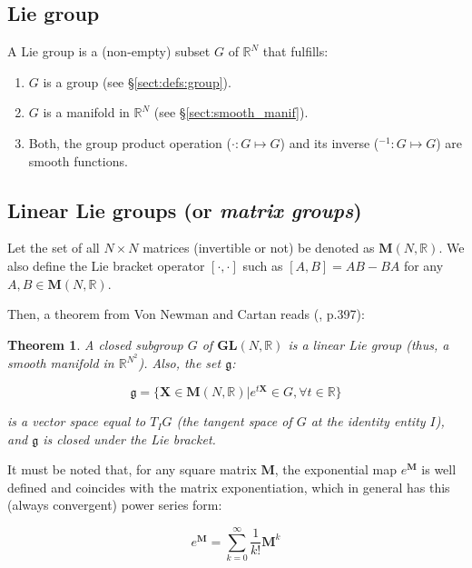 \documentclass[a4paper,11pt]{report}
\newtheorem{mytheorem}{Theorem}
\begin{document}
\subsection{Lie group}
\label{sect:lie_group_def}

A Lie group is a (non-empty) subset $G$ of $\mathbb{R}^N$ that fulfills:
\begin{enumerate}
 \item $G$ is a group (see \S\ref{sect:defs:group}).
 \item $G$ is a manifold in $\mathbb{R}^N$ (see \S\ref{sect:smooth_manif}).
 \item Both, the group product operation ($\cdot: G \mapsto G$) 
and its inverse (${}^{-1}: G \mapsto G$) are smooth functions.
\end{enumerate}


\subsection{Linear Lie groups (or \emph{matrix groups})}
\label{sect:lie:linear}

Let the set of all $N \times N$ matrices (invertible or not)
be denoted as $\mathbf{M}(N,\mathbb{R})$. 
We also define the Lie bracket operator $[\cdot,\cdot]$ such as 
$[A,B]=AB-BA$ for any $A,B \in \mathbf{M}(N,\mathbb{R})$.

Then, a theorem from Von Newman and Cartan reads (\cite{gallier2001geometric}, p.397):

\begin{mytheorem}
A closed subgroup $G$ of $\mathbf{GL}(N,\mathbb{R})$
is a linear Lie group (thus, a smooth manifold in $\mathbb{R}^{N^2}$).
Also, the set $\mathfrak{g}$:

\begin{equation}
  \mathfrak{g} = \{ \mathbf{X} \in \mathbf{M}(N,\mathbb{R}) | e^{t\mathbf{X}} \in G,  \forall t \in \mathbb{R}  \}
\end{equation}

\noindent is a vector space equal to $T_I G$ (the tangent space of $G$ 
at the identity entity $I$), and $\mathfrak{g}$ is closed under the Lie bracket.
\end{mytheorem}

It must be noted that, for any square matrix $\mathbf{M}$, 
the exponential map $e^{\mathbf{M}}$ is well defined and coincides with the matrix 
exponentiation, which in general has this (always convergent) power series form:

\begin{equation}
\label{eq:exp_map_matrices}
e^{\mathbf{M}} = \sum_{k=0}^\infty \frac{1}{k!} \mathbf{M}^k
\end{equation}
\end{document}
